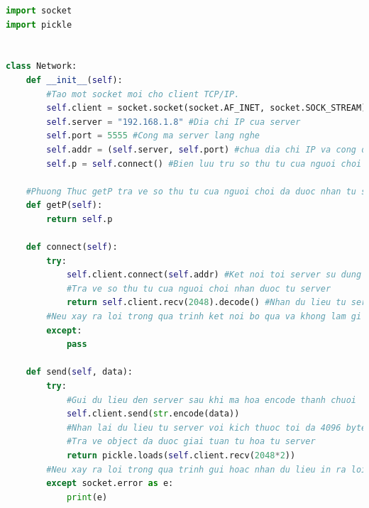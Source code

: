 \documentclass[a4paper]{article}
\begin{document}
\begin{mdframed}[hidealllines=true,backgroundcolor=magenta!10]
	\begin{lstlisting}[language=Python]
import socket
import pickle


class Network:
    def __init__(self):
        #Tao mot socket moi cho client TCP/IP.
        self.client = socket.socket(socket.AF_INET, socket.SOCK_STREAM)
        self.server = "192.168.1.8" #Dia chi IP cua server
        self.port = 5555 #Cong ma server lang nghe
        self.addr = (self.server, self.port) #chua dia chi IP va cong dung de ket noi toi server 
        self.p = self.connect() #Bien luu tru so thu tu cua nguoi choi duoc nhan tu server sau khi ket noi 

    #Phuong Thuc getP tra ve so thu tu cua nguoi choi da duoc nhan tu server 
    def getP(self):
        return self.p

    def connect(self):
        try:
            self.client.connect(self.addr) #Ket noi toi server su dung dia chi self addr 
            #Tra ve so thu tu cua nguoi choi nhan duoc tu server 
            return self.client.recv(2048).decode() #Nhan du lieu tu server so thu tu cua nguoi choi voi kich thuoc toi da 2048 byte va giai ma decode no thanh chuoi 
        #Neu xay ra loi trong qua trinh ket noi bo qua va khong lam gi trong except
        except:
            pass

    def send(self, data):
        try:
            #Gui du lieu den server sau khi ma hoa encode thanh chuoi 
            self.client.send(str.encode(data))
            #Nhan lai du lieu tu server voi kich thuoc toi da 4096 byte 2048 2 va giai tuan tu hoa deserialize no bang pickle 
            #Tra ve object da duoc giai tuan tu hoa tu server 
            return pickle.loads(self.client.recv(2048*2))
        #Neu xay ra loi trong qua trinh gui hoac nhan du lieu in ra loi
        except socket.error as e:
            print(e)
	\end{lstlisting}
\end{mdframed}
\end{document}
